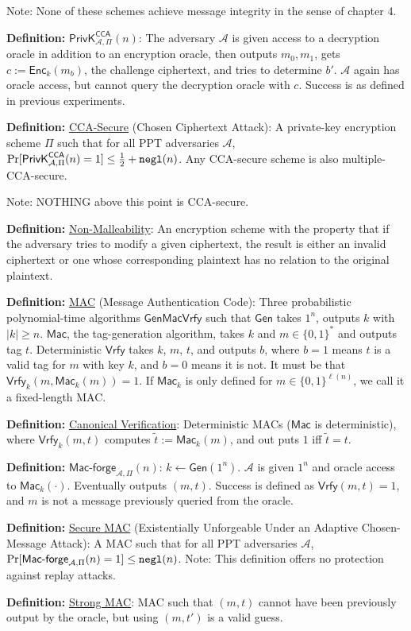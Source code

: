 \documentclass[10pt]{article}
\newcommand{\AAA}{\mathcal{A}}
\newcommand{\defn}[1]{{\bf Definition:} \underline{#1}}
\newcommand{\Enc}{\mathsf{Enc}}
\newcommand{\Mac}{\mathsf{Mac}}
\newcommand{\Macf}{\mathsf{Mac\text{-}forge}}
\newcommand{\Vrfy}{\mathsf{Vrfy}}
\newcommand{\Gen}{\mathsf{Gen}}
\newcommand{\ExptCcaArgs}[2]{\mathsf{PrivK}^{\mathsf{CCA}}_{#1,#2}}
\newcommand{\ExptCca}{\ExptCcaArgs{\AAA}{\Pi}}
\newcommand{\negl}{{\tt negl}}
\newcommand{\from}{\leftarrow}
\begin{document}
\begin{multicols}{3}
Note: None of these schemes achieve message integrity in the sense of chapter 4.

\defn{$\ExptCca(n)$}: The adversary $\AAA$ is given access to a decryption oracle in addition to an encryption oracle, then outputs $m_0,m_1$, gets $c:=\Enc_k(m_b)$, the challenge ciphertext, and tries to determine $b'$. $\AAA$ again has oracle access, but cannot query the decryption oracle with $c$. Success is as defined in previous experiments.

\defn{CCA-Secure} (Chosen Ciphertext Attack): A private-key encryption scheme $\Pi$ such that for all PPT adversaries $\AAA$, $\Pr[\ExptCca(n)=1]\leq\frac{1}{2}+\negl(n)$. Any CCA-secure scheme is also multiple-CCA-secure.

Note: NOTHING above this point is CCA-secure.

\defn{Non-Malleability}: An encryption scheme with the property that if the adversary tries to modify a given ciphertext, the result is either an invalid ciphertext or one whose corresponding plaintext has no relation to the original plaintext.

\defn{MAC} (Message Authentication Code): Three probabilistic polynomial-time algorithms $\Gen\Mac\Vrfy$ such that $\Gen$ takes $1^n$, outputs $k$ with $|k|\geq n$. $\Mac$, the tag-generation algorithm, takes $k$ and $m\in\{0,1\}^*$ and outputs tag $t$. Deterministic $\Vrfy$ takes $k$, $m$, $t$, and outputs $b$, where $b=1$ means $t$ is a valid tag for $m$ with key $k$, and $b=0$ means it is not. It must be that $\Vrfy_k(m,\Mac_k(m))=1$. If $\Mac_k$ is only defined for $m\in\{0,1\}^{\ell(n)}$, we call it a fixed-length MAC.

\defn{Canonical Verification}: Deterministic MACs ($\Mac$ is deterministic), where $\Vrfy_k(m,t)$ computes $\tilde{t}:=\Mac_k(m)$, and out puts $1$ iff $\tilde{t}=t$.

\defn{$\Macf_{\AAA,\Pi}(n)$}: $k\from\Gen(1^n)$. $\AAA$ is given $1^n$ and oracle access to $\Mac_k(\cdot)$. Eventually outputs $(m,t)$. Success is defined as $\Vrfy(m,t)=1$, and $m$ is not a message previously queried from the oracle.

\defn{Secure MAC} (Existentially Unforgeable Under an Adaptive Chosen-Message Attack): A MAC such that for all PPT adversaries $\AAA$, $\Pr[\Macf_{\AAA,\Pi}(n)=1]\leq\negl(n)$. Note: This definition offers no protection against replay attacks.

\defn{Strong MAC}: MAC such that $(m,t)$ cannot have been previously output by the oracle, but using $(m,t')$ is a valid guess.


\end{multicols}
\end{document}
